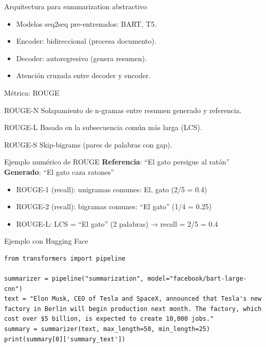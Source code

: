 \documentclass[aspectratio=169, 10pt, xcolor=table]{beamer}
\begin{document}
\begin{frame}{Arquitectura para summarization abstractivo}
    \begin{itemize}
        \item Modelos seq2seq pre-entrenados: BART, T5.
        \item Encoder: bidireccional (procesa documento).
        \item Decoder: autoregresivo (genera resumen).
        \item Atención cruzada entre decoder y encoder.
    \end{itemize}
\end{frame}

\begin{frame}{Métrica: ROUGE}
    \begin{block}{ROUGE-N}
        Solapamiento de n-gramas entre resumen generado y referencia.
    \end{block}
    \begin{block}{ROUGE-L}
        Basado en la subsecuencia común más larga (LCS).
    \end{block}
    \begin{block}{ROUGE-S}
        Skip-bigrams (pares de palabras con gap).
    \end{block}
\end{frame}

\begin{frame}{Ejemplo numérico de ROUGE}
    \textbf{Referencia}: ``El gato persigue al ratón'' \\
    \textbf{Generado}: ``El gato caza ratones'' \\
    \begin{itemize}
        \item ROUGE-1 (recall): unigramas comunes: El, gato (2/5 = 0.4)
        \item ROUGE-2 (recall): bigramas comunes: ``El gato'' (1/4 = 0.25)
        \item ROUGE-L: LCS = ``El gato'' (2 palabras) → recall = 2/5 = 0.4
    \end{itemize}
\end{frame}

\begin{frame}[fragile]{Ejemplo con Hugging Face}
    \begin{lstlisting}
from transformers import pipeline

summarizer = pipeline("summarization", model="facebook/bart-large-cnn")
text = "Elon Musk, CEO of Tesla and SpaceX, announced that Tesla's new factory in Berlin will begin production next month. The factory, which cost over $5 billion, is expected to create 10,000 jobs."
summary = summarizer(text, max_length=50, min_length=25)
print(summary[0]['summary_text'])
    \end{lstlisting}
\end{frame}
\end{document}
